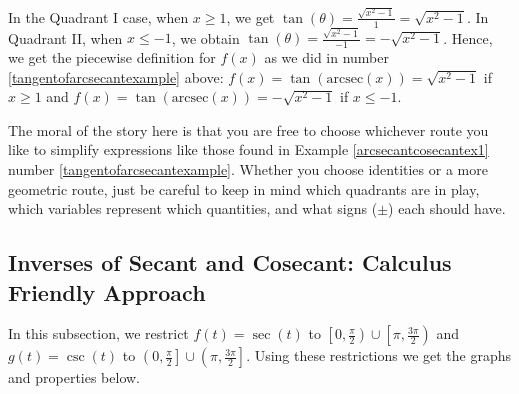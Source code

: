 \smallskip

In the Quadrant I case, when $x \geq 1$, we get $\tan(\theta)  = \frac{\sqrt{x^2-1}}{1} = \sqrt{x^2-1}$.  In Quadrant II, when $x \leq -1$, we obtain  $\tan(\theta)  = \frac{\sqrt{x^2-1}}{-1} = - \sqrt{x^2-1}$.   Hence, we get the piecewise definition for $f(x)$ as we did in number \ref{tangentofarcsecantexample} above:  $f(x)  = \tan(\mbox{arcsec}(x)) = \sqrt{x^2-1}$ if $x \geq 1$ and $f(x)  = \tan(\mbox{arcsec}(x)) = -\sqrt{x^2-1}$ if $x \leq -1$.

\smallskip

The moral of the story here is that you are free to choose whichever route you like to simplify expressions like those found in Example \ref{arcsecantcosecantex1} number \ref{tangentofarcsecantexample}.  Whether you choose identities or a more geometric route, just be careful to keep in mind which quadrants are in play, which variables represent which quantities, and what signs ($\pm$) each should have.


\subsection{Inverses of Secant and Cosecant: Calculus Friendly Approach}
\label{arcsecantcalcfriendly}

In this subsection, we restrict $f(t) = \sec(t)$ to $\left[0, \frac{\pi}{2}\right) \cup \left[\pi, \frac{3\pi}{2}\right)$  and  $g(t) = \csc(t)$ to $\left(0, \frac{\pi}{2}\right] \cup \left( \pi, \frac{3\pi}{2}\right]$.  Using these restrictions we get the graphs and properties below.

